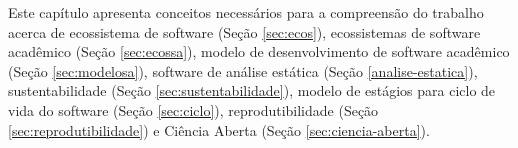 \label{fundamentacao}

Este capítulo apresenta conceitos necessários para a compreensão do trabalho
acerca de ecossistema de software (Seção \ref{sec:ecos}),
ecossistemas de software acadêmico (Seção \ref{sec:ecossa}),
modelo de desenvolvimento de software acadêmico (Seção \ref{sec:modelosa}),
software de análise estática (Seção \ref{analise-estatica}),
sustentabilidade (Seção \ref{sec:sustentabilidade}), modelo de estágios
para ciclo de vida do software (Seção \ref{sec:ciclo}), reprodutibilidade (Seção \ref{sec:reprodutibilidade}) e
Ciência Aberta (Seção \ref{sec:ciencia-aberta}).






